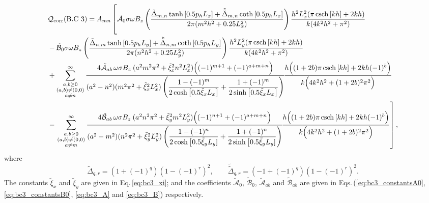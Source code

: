 \documentclass[aps,prfluids,reprint,superscriptaddress]{revtex4-2}
\newcommand{\ii}[1]{\text{#1}}
\newcommand{\nn}{\nonumber}
\begin{document}
\begin{align}
	\nn
	&\mathcal{Q}_{\rm corr}  (\ii{B.C 3})= 
	A_{mn} \left[ \rule{0pt}{0.9cm} 
	\tilde{\mathcal A}_0 \sigma\omega B_z 
	\left( \dfrac{ \tilde\Delta_{m,n}\tanh{[0.5p_hL_x]}
	+
	\tilde{\tilde{\Delta}}_{m,n}\coth{[0.5p_hL_x]}
	}
	{2\pi(m^2h^2+0.25L_x^2)} \right)
	\dfrac{h^2L_x^2(\pi\csch{[kh]} + 2kh)}
	{k(4k^2h^2+\pi^2)}
	\right.
	\\
	\nn
	&- 
	\tilde{\mathcal B}_0 \sigma\omega B_z 
	\left( \dfrac{ \tilde\Delta_{n,m}\tanh{[0.5p_hL_y]}
		+
		\tilde{\tilde{\Delta}}_{n,m}\coth{[0.5p_hL_y]}
	}
	{2\pi(n^2h^2+0.25L_y^2)} \right)
	\dfrac{h^2L_y^2(\pi\csch{[kh]} + 2kh)}
	{k(4k^2h^2+\pi^2)}
	\\
	\nn
	&+ 
	\sum_{\substack{a, b \geq 0 \\ (a,b) 
			\neq (0,0) \\
			a\neq n	
	}}^{\infty}
		\frac{ 
		4 \tilde{\mathcal A}_{ab} \,\omega\sigma B_z \:
		(a^2m^2\pi^2 + {\tilde\xi_x}^2n^2L_x^2)
		\Bigl( (-1)^{m+1} + (-1)^{a+m+n} \Bigr) }
	{(a^2-n^2) (m^2\pi^2 + {\tilde\xi_x}^2L_x^2)
		\left(
		\dfrac{1-(-1)^m}{2\cosh{\bigl[0.5\tilde\xi_x L_x \bigr]}} + \dfrac{1+(-1)^m}{2\sinh{\bigl[0.5\tilde\xi_x L_x \bigr]}}
		\right)
	}\!
	\frac{h\Bigl( (1+2b)\pi\csch{[kh]} + 2kh(-1)^b \Bigr)}
	{k \Bigl( 4k^2h^2 + (1+2b)^2\pi^2 \Bigr)}
	\\
	&- \left.
	\sum_{\substack{a, b \geq 0 \\ (a,b) 
			\neq (0,0) \\
			a\neq m	
	}}^{\infty}
		\frac{ 4 \tilde{\mathcal B}_{ab} \,\omega\sigma B_z \:
		(a^2n^2\pi^2 + {\tilde\xi_y}^2m^2L_y^2)
		\Bigl( (-1)^{n+1} + (-1)^{a+m+n} \Bigr) }
	{(a^2-m^2) (n^2\pi^2 + {\tilde\xi_y}^2L_y^2)
		\left(
		\dfrac{1-(-1)^n}{2\cosh{\bigl[0.5\tilde\xi_y L_y]}} + \dfrac{1+(-1)^n}{2\sinh{\bigl[0.5\tilde\xi_y L_y]}}
		\right)
	}\!
	\frac{h\Bigl( (1+2b)\pi\csch{[kh]} + 2kh(-1)^b \Bigr)}
	{k \Bigl( 4k^2h^2 + (1+2b)^2\pi^2 \Bigr)}
	\rule{0pt}{1cm} \right],
	\label{eq:qcorr_bc3}
\end{align}
where
\begin{equation}
	\tilde\Delta_{q,r} = (1+(-1)^q)(1-(-1)^r)^2,
	\qquad
	\tilde{\tilde{\Delta}}_{q,r} = (-1+(-1)^q)(1-(-1)^r)^2 .
\end{equation}
The constants $\tilde\xi_x$ and $\tilde\xi_y$ are given in Eq.\,\eqref{eq:bc3_xi}; and the coefficients $\tilde{\mathcal A}_0$, $\tilde{\mathcal B}_0$, $\tilde{\mathcal A}_{ab}$ and $\tilde{\mathcal B}_{ab}$ are given in Eqs.\,(\ref{eq:bc3_constantsA0}, \ref{eq:bc3_constantsB0}, \ref{eq:bc3_A} and \ref{eq:bc3_B}) respectively. 
\end{document}
